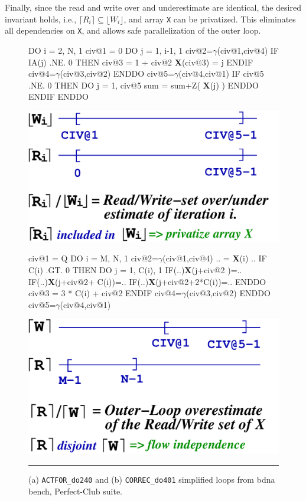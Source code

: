 \documentclass{sig-alternate}
\newcommand{\mymath}[1]{$ #1 $}
\begin{document}
Finally, since the read and write over and underestimate are identical, the desired 
invariant holds, i.e., $\lceil R_i\rceil \subseteq \lfloor W_i\rfloor$, and
array {\tt X} can be privatized. This eliminates all dependencies on {\tt X},
and allows safe parallelization of the outer loop.  


\begin{figure}
\begin{minipage}{0.45\columnwidth}
\begin{colorcode}
DO i = 2, N, 1
 civ@1 = 0
 DO j = 1, i-1, 1
  civ@2=\mymath{\gamma}(civ@1,civ@4)
  IF IA(j) .NE. 0 THEN
   civ@3 = 1 + civ@2
   {\bf{}X}(civ@3) = j
  ENDIF
  civ@4=\mymath{\gamma}(civ@3,civ@2)
 ENDDO
 civ@5=\mymath{\gamma}(civ@4,civ@1)
 IF civ@5 .NE. 0 THEN
  DO j = 1, civ@5
   sum = sum+Z( {\bf{}X}(j) )
ENDDO ENDIF ENDDO
\end{colorcode}
\includegraphics[width=1.1\textwidth]{Figures/ActforRWsets} 
\end{minipage}
\begin{minipage}{0.48\columnwidth}
\begin{colorcode}
civ@1 = Q
DO i = M, N, 1
 civ@2=\mymath{\gamma}(civ@1,civ@4)
 .. = {\bf X}(i) ..
 IF C(i) .GT. 0 THEN
  DO j = 1, C(i), 1
   IF(..){\bf{}X}(j+civ@2       )=..
   IF(..){\bf{}X}(j+civ@2+  C(i))=..
   IF(..){\bf{}X}(j+civ@2+2*C(i))=..
  ENDDO
  civ@3 = 3 * C(i) + civ@2
 ENDIF
 civ@4=\mymath{\gamma}(civ@3,civ@2)
ENDDO
civ@5=\mymath{\gamma}(civ@4,civ@1)  
\end{colorcode}
\hspace{2ex}\includegraphics[width=1\textwidth]{Figures/CorrecRWsets} 
\end{minipage}
\hrule
\caption{(a) {\tt ACTFOR\_do240} and (b) {\tt CORREC\_do401} simplified loops 
            from {\sc bdna} bench, {\sc Perfect-Club} suite.}
\label{fig:codeActforCorrec}
\end{figure}
\end{document}
